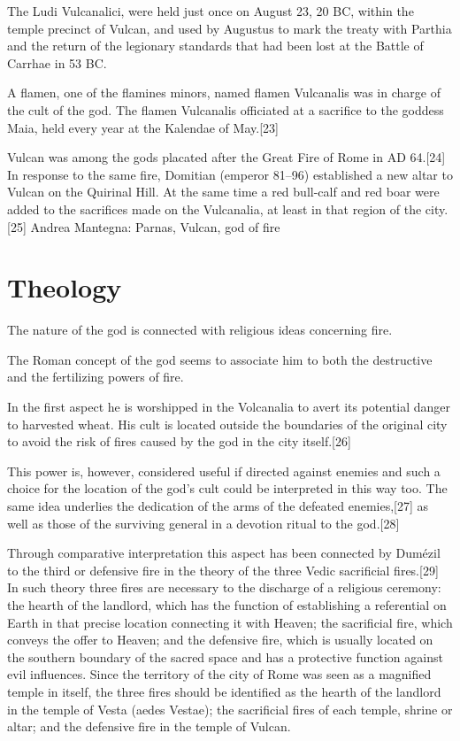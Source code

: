 The Ludi Vulcanalici, were held just once on August 23, 20 BC, within the temple precinct of Vulcan, and used by Augustus to mark the treaty with Parthia and the return of the legionary standards that had been lost at the Battle of Carrhae in 53 BC.

A flamen, one of the flamines minors, named flamen Vulcanalis was in charge of the cult of the god. The flamen Vulcanalis officiated at a sacrifice to the goddess Maia, held every year at the Kalendae of May.[23]

Vulcan was among the gods placated after the Great Fire of Rome in AD 64.[24] In response to the same fire, Domitian (emperor 81–96) established a new altar to Vulcan on the Quirinal Hill. At the same time a red bull-calf and red boar were added to the sacrifices made on the Vulcanalia, at least in that region of the city.[25]
Andrea Mantegna: Parnas, Vulcan, god of fire


\section{Theology}

The nature of the god is connected with religious ideas concerning fire.

The Roman concept of the god seems to associate him to both the destructive and the fertilizing powers of fire.

In the first aspect he is worshipped in the Volcanalia to avert its potential danger to harvested wheat. His cult is located outside the boundaries of the original city to avoid the risk of fires caused by the god in the city itself.[26]

This power is, however, considered useful if directed against enemies and such a choice for the location of the god's cult could be interpreted in this way too. The same idea underlies the dedication of the arms of the defeated enemies,[27] as well as those of the surviving general in a devotion ritual to the god.[28]

Through comparative interpretation this aspect has been connected by Dumézil to the third or defensive fire in the theory of the three Vedic sacrificial fires.[29] In such theory three fires are necessary to the discharge of a religious ceremony: the hearth of the landlord, which has the function of establishing a referential on Earth in that precise location connecting it with Heaven; the sacrificial fire, which conveys the offer to Heaven; and the defensive fire, which is usually located on the southern boundary of the sacred space and has a protective function against evil influences. Since the territory of the city of Rome was seen as a magnified temple in itself, the three fires should be identified as the hearth of the landlord in the temple of Vesta (aedes Vestae); the sacrificial fires of each temple, shrine or altar; and the defensive fire in the temple of Vulcan.

